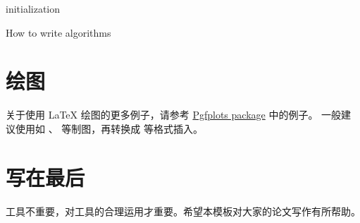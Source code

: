 \begin{algorithm}[H]
  \SetAlgoLined
   initialization\;
  \caption{How to write algorithms}
\end{algorithm}


\section{绘图}

关于使用 \LaTeX{} 绘图的更多例子，请参考 \href{https://www.overleaf.com/learn/latex/Pgfplots_package}{Pgfplots package} 中的例子。
一般建议使用如 、 等制图，再转换成  等格式插入。

\section{写在最后}
工具不重要，对工具的合理运用才重要。希望本模板对大家的论文写作有所帮助。
